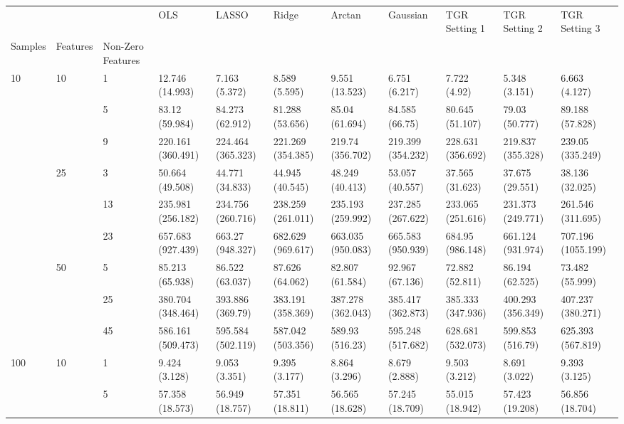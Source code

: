 \begin{tabular}{lllllllllll}
\toprule
 &  &  &  OLS &  LASSO &  Ridge &  Arctan &  Gaussian &  TGR Setting 1 &  TGR Setting 2 &  TGR Setting 3 \\
Samples & Features & Non-Zero Features &  &  &  &  &  &  &  &  \\
\midrule
\multirow[t]{9}{*}{10} & \multirow[t]{3}{*}{10} & 1 & 12.746 (14.993) & 7.163 (5.372) & 8.589 (5.595) & 9.551 (13.523) & 6.751 (6.217) & 7.722 (4.92) & 5.348 (3.151) & 6.663 (4.127) \\
 &  & 5 & 83.12 (59.984) & 84.273 (62.912) & 81.288 (53.656) & 85.04 (61.694) & 84.585 (66.75) & 80.645 (51.107) & 79.03 (50.777) & 89.188 (57.828) \\
 &  & 9 & 220.161 (360.491) & 224.464 (365.323) & 221.269 (354.385) & 219.74 (356.702) & 219.399 (354.232) & 228.631 (356.692) & 219.837 (355.328) & 239.05 (335.249) \\
\cline{2-11}
 & \multirow[t]{3}{*}{25} & 3 & 50.664 (49.508) & 44.771 (34.833) & 44.945 (40.545) & 48.249 (40.413) & 53.057 (40.557) & 37.565 (31.623) & 37.675 (29.551) & 38.136 (32.025) \\
 &  & 13 & 235.981 (256.182) & 234.756 (260.716) & 238.259 (261.011) & 235.193 (259.992) & 237.285 (267.622) & 233.065 (251.616) & 231.373 (249.771) & 261.546 (311.695) \\
 &  & 23 & 657.683 (927.439) & 663.27 (948.327) & 682.629 (969.617) & 663.035 (950.083) & 665.583 (950.939) & 684.95 (986.148) & 661.124 (931.974) & 707.196 (1055.199) \\
\cline{2-11}
 & \multirow[t]{3}{*}{50} & 5 & 85.213 (65.938) & 86.522 (63.037) & 87.626 (64.062) & 82.807 (61.584) & 92.967 (67.136) & 72.882 (52.811) & 86.194 (62.525) & 73.482 (55.999) \\
 &  & 25 & 380.704 (348.464) & 393.886 (369.79) & 383.191 (358.369) & 387.278 (362.043) & 385.417 (362.873) & 385.333 (347.936) & 400.293 (356.349) & 407.237 (380.271) \\
 &  & 45 & 586.161 (509.473) & 595.584 (502.119) & 587.042 (503.356) & 589.93 (516.23) & 595.248 (517.682) & 628.681 (532.073) & 599.853 (516.79) & 625.393 (567.819) \\
\cline{1-11} \cline{2-11}
\multirow[t]{9}{*}{100} & \multirow[t]{3}{*}{10} & 1 & 9.424 (3.128) & 9.053 (3.351) & 9.395 (3.177) & 8.864 (3.296) & 8.679 (2.888) & 9.503 (3.212) & 8.691 (3.022) & 9.393 (3.125) \\
 &  & 5 & 57.358 (18.573) & 56.949 (18.757) & 57.351 (18.811) & 56.565 (18.628) & 57.245 (18.709) & 55.015 (18.942) & 57.423 (19.208) & 56.856 (18.704) \\

\end{tabular}
